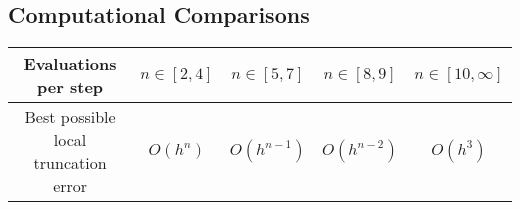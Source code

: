 \subsection{Computational Comparisons}
\begin{table}[H]
\begin{tabular}{|c|c|c|c|c|}
\hline
Evaluations per step & $n\in[2,4]$ & $n\in[5,7]$ & $n\in[8,9]$ & $n\in[10,\infty]$ \\ \hline
Best possible local truncation error & $O(h^n)$ & $O(h^{n-1})$ & $O(h^{n-2})$ & $O(h^3)$ \\ \hline
\end{tabular}
\end{table}